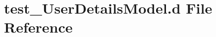 \hypertarget{test___user_details_model_8d}{}\section{test\+\_\+\+User\+Details\+Model.\+d File Reference}
\label{test___user_details_model_8d}
